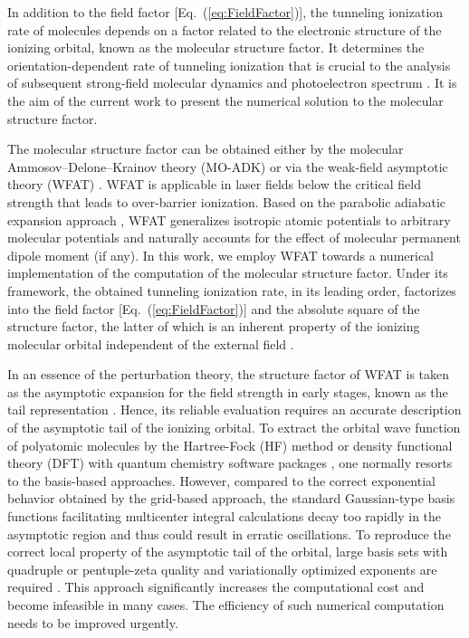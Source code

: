 \documentclass[preprint,12pt]{elsarticle} %
\begin{document}
In addition to the field factor [Eq.~(\ref{eq:FieldFactor})], the tunneling ionization rate of molecules depends on a factor related to the electronic structure of the ionizing orbital, known as the molecular structure factor. It determines the orientation-dependent rate of tunneling ionization that is crucial to the analysis of subsequent strong-field molecular dynamics and photoelectron spectrum \cite{pavicic_direct_2007}. It is the aim of the current work to present the numerical solution to the molecular structure factor.

The molecular structure factor can be obtained either by the molecular Ammosov--Delone--Krainov theory (MO-ADK) \cite{tong_theory_2002, pavicic_direct_2007, holmegaard_photoelectron_2010, johansen_alignment-dependent_2016, zhao_accurate_2017} or via the weak-field asymptotic theory (WFAT) \cite{tolstikhin_theory_2011, madsen_application_2012}. WFAT is applicable in laser fields below the critical field strength that leads to over-barrier ionization. Based on the parabolic adiabatic expansion approach \cite{batishchev_atomic_2010}, WFAT generalizes isotropic atomic potentials to arbitrary molecular potentials and naturally accounts for the effect of molecular permanent dipole moment (if any). In this work, we employ WFAT towards a numerical implementation of the computation of the molecular structure factor. Under its framework, the obtained tunneling ionization rate, in its leading order, factorizes into the field factor [Eq.~(\ref{eq:FieldFactor})] and the absolute square of the structure factor, the latter of which is an inherent property of the ionizing molecular orbital independent of the external field \cite{trinh_first-order_2013}.

In an essence of the perturbation theory, the structure factor of WFAT is taken as the asymptotic expansion for the field strength in early stages, known as the tail representation \cite{madsen_structure_2013, trinh_weak-field_2015, madsen_application_2014}. Hence, its reliable evaluation requires an accurate description of the asymptotic tail of the ionizing orbital. To extract the orbital wave function of polyatomic molecules by the Hartree-Fock (HF) method or density functional theory (DFT) with quantum chemistry software packages \cite{madsen_application_2014, saito_structure_2015}, one normally resorts to the basis-based approaches. However, compared to the correct exponential behavior obtained by the grid-based approach, the standard Gaussian-type basis functions facilitating multicenter integral calculations decay too rapidly in the asymptotic region and thus could result in erratic oscillations. To reproduce the correct local property of the asymptotic tail of the orbital, large basis sets with quadruple or pentuple-zeta quality and variationally optimized exponents are required \cite{trinh_first-order_2013}. This approach significantly increases the computational cost and become infeasible in many cases. The efficiency of such numerical computation needs to be improved urgently.
\end{document}
